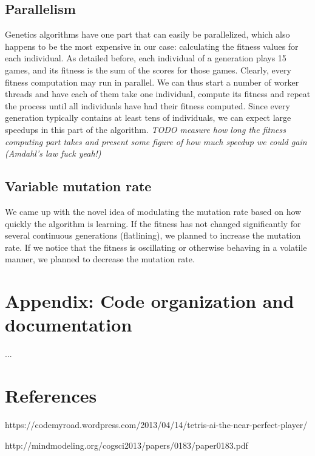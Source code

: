 \documentclass[10pt]{report}
\begin{document}
\subsection{Parallelism}
Genetics algorithms have one part that can easily be parallelized, which also happens to be the most expensive in our case: calculating the fitness values for each individual. As detailed before, each individual of a generation plays 15 games, and its fitness is the sum of the scores for those games. Clearly, every fitness computation may run in parallel. We can thus start a number of worker threads and have each of them take one individual, compute its fitness and repeat the process until all individuals have had their fitness computed. Since every generation typically contains at least tens of individuals, we can expect large speedups in this part of the algorithm.
\textit{TODO measure how long the fitness computing part takes and present some figure of how much speedup we could gain (Amdahl’s law fuck yeah!)}

\subsection{Variable mutation rate}
We came up with the novel idea of modulating the mutation rate based on how quickly the algorithm is learning. If the fitness has not changed significantly for several continuous generations (flatlining), we planned to increase the mutation rate. If we notice that the fitness is oscillating or otherwise behaving in a volatile manner, we planned to decrease the mutation rate.

\section{Appendix: Code organization and documentation}
...

\section{References}

https://codemyroad.wordpress.com/2013/04/14/tetris-ai-the-near-perfect-player/

http://mindmodeling.org/cogsci2013/papers/0183/paper0183.pdf
\end{document}
